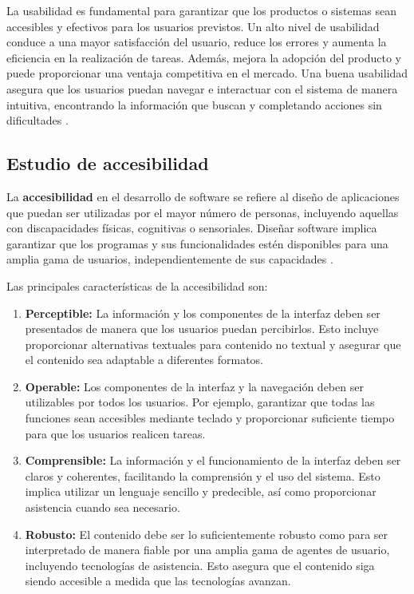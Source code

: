 La usabilidad es fundamental para garantizar que los productos o sistemas sean accesibles y efectivos para los usuarios previstos. Un alto nivel de usabilidad conduce a una mayor satisfacción del usuario, reduce los errores y aumenta la eficiencia en la realización de tareas. Además, mejora la adopción del producto y puede proporcionar una ventaja competitiva en el mercado. Una buena usabilidad asegura que los usuarios puedan navegar e interactuar con el sistema de manera intuitiva, encontrando la información que buscan y completando acciones sin dificultades \cite{adverthia2019}.


\subsection{Estudio de accesibilidad}

La \textbf{accesibilidad} en el desarrollo de software se refiere al diseño de aplicaciones que puedan ser utilizadas por el mayor número de personas, incluyendo aquellas con discapacidades físicas, cognitivas o sensoriales. Diseñar software implica garantizar que los programas y sus funcionalidades estén disponibles para una amplia gama de usuarios, independientemente de sus capacidades \cite{thoughtworks2020}.

Las principales características de la accesibilidad son: \cite{torresburriel2024}

\begin{enumerate}
    \item \textbf{Perceptible:} La información y los componentes de la interfaz deben ser presentados de manera que los usuarios puedan percibirlos. Esto incluye proporcionar alternativas textuales para contenido no textual y asegurar que el contenido sea adaptable a diferentes formatos. 
    \item \textbf{Operable:} Los componentes de la interfaz y la navegación deben ser utilizables por todos los usuarios. Por ejemplo, garantizar que todas las funciones sean accesibles mediante teclado y proporcionar suficiente tiempo para que los usuarios realicen tareas.
    \item \textbf{Comprensible:} La información y el funcionamiento de la interfaz deben ser claros y coherentes, facilitando la comprensión y el uso del sistema. Esto implica utilizar un lenguaje sencillo y predecible, así como proporcionar asistencia cuando sea necesario. 
    \item \textbf{Robusto:} El contenido debe ser lo suficientemente robusto como para ser interpretado de manera fiable por una amplia gama de agentes de usuario, incluyendo tecnologías de asistencia. Esto asegura que el contenido siga siendo accesible a medida que las tecnologías avanzan.
\end{enumerate}



